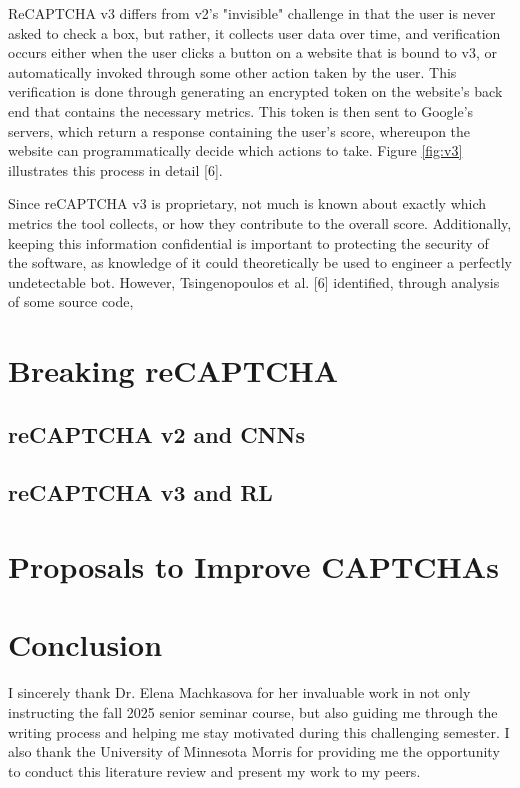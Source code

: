 \documentclass[sigplan,screen,nonacm]{acmart-tagged}
\begin{document}
ReCAPTCHA v3 differs from v2's "invisible" challenge in that the user is never asked to check a box, but rather, it collects user data over time, and verification occurs either when the user clicks a button on a website that is bound to v3, or automatically invoked through some other action taken by the user. This verification is done through generating an encrypted token on the website's back end that contains the necessary metrics. This token is then sent to Google's servers, which return a response containing the user's score, whereupon the website can programmatically decide which actions to take. Figure \ref{fig:v3} illustrates this process in detail [6].

Since reCAPTCHA v3 is proprietary, not much is known about exactly which metrics the tool collects, or how they contribute to the overall score. Additionally, keeping this information confidential is important to protecting the security of the software, as knowledge of it could theoretically be used to engineer a perfectly undetectable bot. However, Tsingenopoulos et al. [6] identified, through analysis of some source code, 

\section{Breaking reCAPTCHA}
\label{sec:bypassing}

\subsection{reCAPTCHA v2 and CNNs}
\label{sec:v2}

\subsection{reCAPTCHA v3 and RL}
\label{sec:v3}

\section{Proposals to Improve CAPTCHAs}

\section{Conclusion}


\begin{acks}
I sincerely thank Dr. Elena Machkasova for her invaluable work in not only instructing the fall 2025 senior seminar course, but also guiding me through the writing process and helping me stay motivated during this challenging semester. I also thank the University of Minnesota Morris for providing me the opportunity to conduct this literature review and present my work to my peers.
\end{acks}



\end{document}
